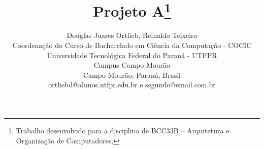 \documentclass[times, 10pt,twocolumn]{article}
\begin{document}
\begin{savenotes}
\title{Projeto A\footnote{Trabalho desenvolvido para a disciplina de BCC33B – Arquitetura e Organização de Computadores.}}


\author{Douglas Juares Ortlieb, Reinaldo Teixeira\\
Coordenação do Curso de Bacharelado em Ciência da Computação - COCIC\\
Universidade Tecnológica Federal do Paraná - UTFPR\\ 
Campus Campo Mourão\\
Campo Mourão, Paraná, Brasil\\
ortliebd@alunos.utfpr.edu.br e segundo@email.com.br\\
}

\maketitle
\thispagestyle{empty}





\end{savenotes}


\end{document}
